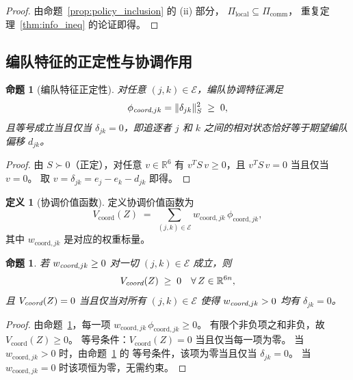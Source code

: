 \documentclass[a4paper,11pt]{article}
\theoremstyle{plain}
\newtheorem{proposition}[theorem]{命题}
\theoremstyle{definition}
\newtheorem{definition}[theorem]{定义}
\theoremstyle{remark}
\newcommand{\R}{\mathbb{R}}
\newcommand{\cE}{\mathcal{E}}
\newcommand{\norm}[1]{\lVert #1 \rVert}
\begin{document}
\begin{proof}
  由命题~\ref{prop:policy_inclusion} 的 (ii) 部分，
  $\Pi_{\text{local}} \subseteq \Pi_{\text{comm}}$，
  重复定理~\ref{thm:info_ineq} 的论证即得。
\end{proof}

\subsection{编队特征的正定性与协调作用}

\begin{proposition}[编队特征正定性]\label{prop:coord_pd}
  对任意 $(j,k)\in\cE$，编队协调特征满足
  \begin{equation}\label{eq:coord_pd}
    \phi_{\emph{coord},jk} = \norm{\delta_{jk}}_S^2 \;\ge\; 0,
  \end{equation}
  且等号成立当且仅当 $\delta_{jk} = 0$，即追逐者 $j$ 和 $k$
  之间的相对状态恰好等于期望编队偏移 $d_{jk}$。
\end{proposition}

\begin{proof}
  由 $S \succ 0$（正定），对任意 $v \in \R^6$ 有
  $v^T S\, v \ge 0$，且 $v^T S\, v = 0$ 当且仅当 $v = 0$。
  取 $v = \delta_{jk} = e_j - e_k - d_{jk}$ 即得。
\end{proof}

\begin{definition}[协调价值函数]\label{def:V_coord}
  定义协调价值函数为
  \begin{equation}\label{eq:V_coord}
    V_{\text{coord}}(Z) \;=\;
    \sum_{(j,k)\in\cE} w_{\text{coord},jk}\, \phi_{\text{coord},jk},
  \end{equation}
  其中 $w_{\text{coord},jk}$ 是对应的权重标量。
\end{definition}

\begin{proposition}\label{prop:V_coord_nonneg}
  若 $w_{\emph{coord},jk} \ge 0$ 对一切 $(j,k)\in\cE$ 成立，则
  \begin{equation}\label{eq:V_coord_nonneg}
    V_{\emph{coord}}(Z) \;\ge\; 0 \quad \forall\, Z \in \R^{6n},
  \end{equation}
  且 $V_{\emph{coord}}(Z) = 0$ 当且仅当对所有
  $(j,k)\in\cE$ 使得 $w_{\emph{coord},jk} > 0$
  均有 $\delta_{jk} = 0$。
\end{proposition}

\begin{proof}
  由命题~\ref{prop:coord_pd}，每一项
  $w_{\text{coord},jk}\, \phi_{\text{coord},jk} \ge 0$。
  有限个非负项之和非负，故 $V_{\text{coord}}(Z) \ge 0$。
  等号条件：$V_{\text{coord}}(Z) = 0$ 当且仅当每一项为零。
  当 $w_{\text{coord},jk} > 0$ 时，由命题~\ref{prop:coord_pd} 的
  等号条件，该项为零当且仅当 $\delta_{jk} = 0$。
  当 $w_{\text{coord},jk} = 0$ 时该项恒为零，无需约束。
\end{proof}
\end{document}
